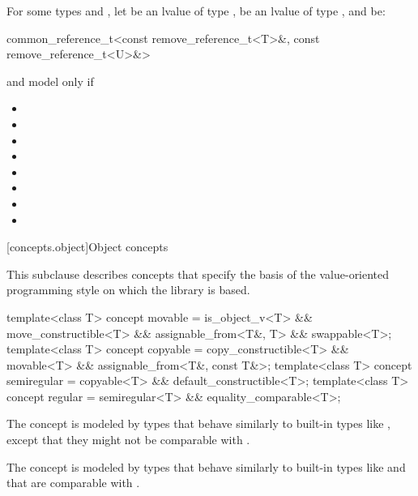 \begin{itemdescr}
\pnum
For some types  and ,
let  be an lvalue of type ,
 be an lvalue of type ,
and  be:
\begin{codeblock}
common_reference_t<const remove_reference_t<T>&, const remove_reference_t<U>&>
\end{codeblock}
 and  model
 only if

\begin{itemize}
\item {}
\item {}
\item {}
\item {}
\item {}
\item {}
\item {}
\item {}
\end{itemize}
\end{itemdescr}

[concepts.object]{Object concepts}

\pnum
This subclause describes concepts that specify the basis of the
value-oriented programming style on which the library is based.

%
%
%
%
\begin{itemdecl}
template<class T>
  concept movable = is_object_v<T> && move_constructible<T> &&
                    assignable_from<T&, T> && swappable<T>;
template<class T>
  concept copyable = copy_constructible<T> && movable<T> && assignable_from<T&, const T&>;
template<class T>
  concept semiregular = copyable<T> && default_constructible<T>;
template<class T>
  concept regular = semiregular<T> && equality_comparable<T>;
\end{itemdecl}

\begin{itemdescr}
\pnum
\begin{note}
The  concept is modeled by types that behave similarly
to built-in types like , except that they might not
be comparable with \tcode{==}.
\end{note}

\pnum
\begin{note}
The  concept is modeled by types that behave similarly to
built-in types like  and that are comparable with
\tcode{==}.
\end{note}
\end{itemdescr}

